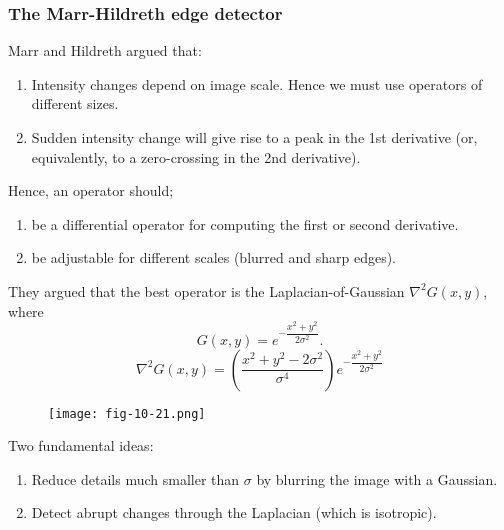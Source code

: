 \subsubsection{The Marr-Hildreth edge detector}

\begin{frame}
Marr and Hildreth argued that:
\begin{enumerate}
\item Intensity changes depend on image scale. Hence we must use operators of different sizes.
\item Sudden intensity change will give rise to a peak in the 1st derivative (or, equivalently, to a zero-crossing in the 2nd derivative).
\end{enumerate}
Hence, an operator should;
\begin{enumerate}
\item be a differential operator for computing the first or second derivative.
\item be adjustable for different scales (blurred and sharp edges).
\end{enumerate}
\end{frame}

\begin{frame}
They argued that the best operator is the Laplacian-of-Gaussian $\nabla^{2}G(x,y)$, where
\[
G(x,y) = e^{-\dfrac{x^{2}+y^{2}}{2\sigma^{2}}}.
\]
\[
\nabla^{2} G(x,y) = \left ( \dfrac{x^{2}+y^{2}-2\sigma^{2}}{\sigma^{4}} \right ) e^{-\dfrac{x^{2}+y^{2}}{2\sigma^{2}}}
\]
\end{frame}

\begin{frame}
\begin{figure}[!h]
\texttt{[image: fig-10-21.png]}
\end{figure}
\end{frame}

\begin{frame}
Two fundamental ideas:
\begin{enumerate}
\item Reduce details much smaller than $\sigma$ by blurring the image with a Gaussian.
\item Detect abrupt changes through the Laplacian (which is isotropic).
\end{enumerate}
\end{frame}

